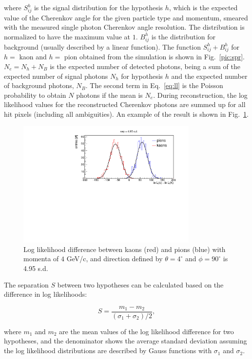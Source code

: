 \noindent where $S^{h}_{ij}$ is the signal distribution for the hypothesis $h$, which is the expected value of the Cherenkov angle for the given particle type and momentum, smeared with the measured single photon Cherenkov angle resolution. The distribution is normalized to have the maximum value at $1$. $B^{h}_{ij}$ is the distribution for background (usually described by a linear function). The function $S^{h}_{ij} + B^{h}_{ij}$ for $h = $ kaon and $h = $ pion obtained from the simulation is shown in Fig.~\ref{pic:spr}. $N_{e} = N_{h} + N_{B}$ is the expected number of detected photons, being a sum of the expected number of signal photons $N_{h}$ for hypothesis $h$ and the expected number of background photons, $N_{B}$. The second term in Eq.~\ref{eq:ll} is the Poisson probability to obtain $N$ photons if the mean is $N_{e}$.
During reconstruction, the log likelihood values for the reconstructed Cherenkov photons are summed up for all hit pixels (including all ambiguities). An example of the result is shown in Fig.~\ref{pic:sepLUT}.

\begin{figure}[!h]
\centering
\includegraphics[clip, trim=0cm 0cm 0cm 0.7cm, width=0.8\textwidth]{pics/hLnDiff.pdf}
\caption{\label{pic:sepLUT}
Log likelihood difference between kaons (red) and pions (blue) with momenta of $4$ GeV/c, and direction defined by $\theta = 4^{\circ}$ and $\phi = 90^{\circ}$ is 4.95 s.d.
}
\end{figure}

The separation $S$ between two hypotheses can be calculated based on the difference in log likelihoods:

\begin{equation}
S = \frac{m_{1}-m_{2}}{(\sigma_{1} + \sigma_{2})/2},
\end{equation}

\noindent where $m_{1}$ and $m_{2}$ are the mean values of the log likelihood difference for two hypotheses, and the denominator shows the average standard deviation assuming the log likelihood distributions are described by Gauss functions with $\sigma_{1}$ and $\sigma_{2}$.